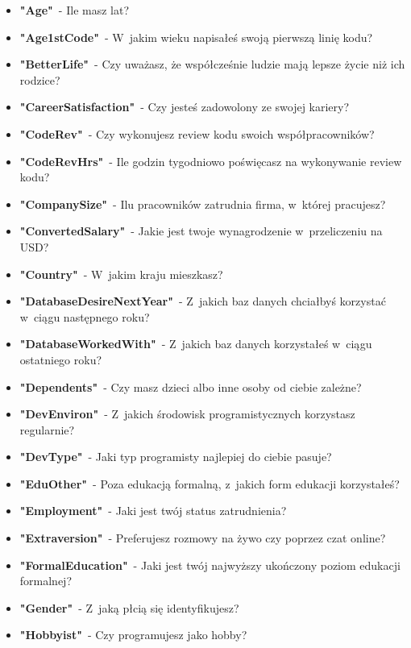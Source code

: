 \begin{appendices}
    \begin{itemize}
        \item \textbf{"Age"}~- Ile masz lat?
        \item \textbf{"Age1stCode"}~- W~jakim wieku napisałeś swoją pierwszą linię kodu?
        \item \textbf{"BetterLife"}~- Czy uważasz, że współcześnie ludzie mają lepsze życie niż ich rodzice?
        \item \textbf{"CareerSatisfaction"}~- Czy jesteś zadowolony ze swojej kariery?
        \item \textbf{"CodeRev"}~- Czy wykonujesz review kodu swoich współpracowników?
        \item \textbf{"CodeRevHrs"}~- Ile godzin tygodniowo poświęcasz na wykonywanie review kodu?
        \item \textbf{"CompanySize"}~- Ilu pracowników zatrudnia firma, w~której pracujesz?
        \item \textbf{"ConvertedSalary"}~- Jakie jest twoje wynagrodzenie w~przeliczeniu na USD?
        \item \textbf{"Country"}~- W~jakim kraju mieszkasz?
        \item \textbf{"DatabaseDesireNextYear"}~- Z~jakich baz danych chciałbyś korzystać w~ciągu następnego roku?
        \item \textbf{"DatabaseWorkedWith"}~- Z~jakich baz danych korzystałeś w~ciągu ostatniego roku?
        \item \textbf{"Dependents"}~- Czy masz dzieci albo inne osoby od ciebie zależne?
        \item \textbf{"DevEnviron"}~- Z~jakich środowisk programistycznych korzystasz regularnie?
        \item \textbf{"DevType"}~- Jaki typ programisty najlepiej do ciebie pasuje?
        \item \textbf{"EduOther"}~- Poza edukacją formalną, z~jakich form edukacji korzystałeś?
        \item \textbf{"Employment"}~- Jaki jest twój status zatrudnienia?
        \item \textbf{"Extraversion"}~- Preferujesz rozmowy na żywo czy poprzez czat online?
        \item \textbf{"FormalEducation"}~- Jaki jest twój najwyższy ukończony poziom edukacji formalnej?
        \item \textbf{"Gender"}~- Z~jaką płcią się identyfikujesz?
        \item \textbf{"Hobbyist"}~- Czy programujesz jako hobby?

\end{itemize}
\end{appendices}
